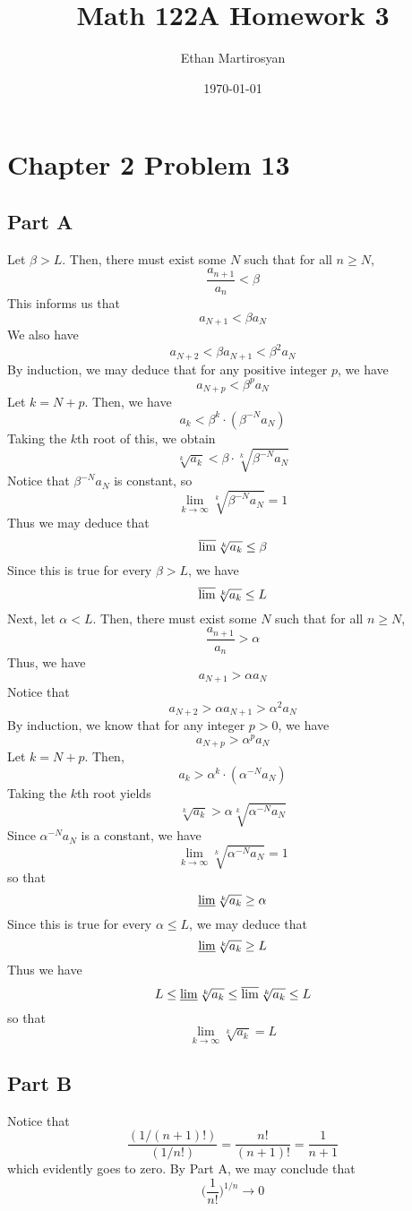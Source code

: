 \documentclass[12pt]{article}
\begin{document}
 
\title{Math 122A Homework 3}
\author{Ethan Martirosyan}
\date{\today}
\maketitle
{}
\hfuzz=50pt
\section*{Chapter 2 Problem 13}
\subsection*{Part A}
Let $\beta > L$. Then, there must exist some $N$ such that for all $n \geq N$,
\[
\frac{a_{n+1}}{a_n} < \beta
\] This informs us that
\[
a_{N+1} < \beta a_N
\] We also have
\[
a_{N+2} < \beta a_{N+1} < \beta^2 a_N
\] By induction, we may deduce that for any positive integer $p$, we have
\[
a_{N+p} < \beta^p a_N
\] Let $k = N+p$. Then, we have
\[
a_k <  \beta^{k} \cdot (\beta^{-N} a_N)
\] Taking the $k$th root of this, we obtain
\[
\sqrt[k]{a_k} < \beta \cdot \sqrt[k]{\beta^{-N} a_N}
\] Notice that $\beta^{-N} a_N$ is constant, so
\[
\lim_{k\rightarrow \infty} \sqrt[k]{\beta^{-N} a_N} = 1
\] Thus we may deduce that
\[
\varlimsup \sqrt[k]{a_k} \leq \beta
\] Since this is true for every $\beta > L$, we have
\[
\varlimsup \sqrt[k]{a_k} \leq L
\] Next, let $\alpha < L$. Then, there must exist some $N$ such that for all $n \geq N$,
\[
\frac{a_{n+1}}{a_n} > \alpha
\] Thus, we have
\[
a_{N+1} > \alpha a_N
\] Notice that
\[
a_{N+2} > \alpha a_{N+1} > \alpha^2 a_N
\] By induction, we know that for any integer $p > 0$, we have
\[
a_{N+p} > \alpha^p a_N
\] Let $k = N+p$. Then,
\[
a_k > \alpha^k \cdot (\alpha^{-N} a_N)
\] Taking the $k$th root yields
\[
\sqrt[k]{a_k} > \alpha \sqrt[k]{\alpha^{-N} a_N}
\] Since $\alpha^{-N} a_N$ is a constant, we have
\[
\lim_{k \rightarrow \infty} \sqrt[k]{\alpha^{-N} a_N} = 1
\] so that
\[
\varliminf \sqrt[k]{a_k} \geq \alpha
\] Since this is true for every $\alpha \leq L$, we may deduce that
\[
\varliminf \sqrt[k]{a_k} \geq L
\] Thus we have
\[
L \leq \varliminf \sqrt[k]{a_k} \leq \varlimsup \sqrt[k]{a_k} \leq L
\] so that
\[
\lim_{k \rightarrow \infty} \sqrt[k]{a_k} = L
\]
\subsection*{Part B}
Notice that 
\[
\frac{(1/(n+1)!)}{(1/n!)} = \frac{n!}{(n+1)!} = \frac{1}{n+1} 
\] which evidently goes to zero. By Part A, we may conclude that
\[
\bigg(\frac{1}{n!}\bigg)^{1/n} \rightarrow 0
\]
\newpage
\end{document}
